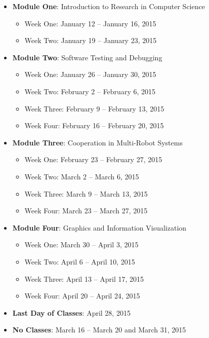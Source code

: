 \begin{itemize}

  \item {\bf Module One}: Introduction to Research in Computer Science

    \begin{itemize}
        \item Week One: January 12 -- January 16, 2015
        \item Week Two: January 19 -- January 23, 2015
    \end{itemize}

  \item {\bf Module Two}: Software Testing and Debugging 

    \begin{itemize}
        \item Week One: January 26 -- January 30, 2015
        \item Week Two: February 2 -- February 6, 2015
        \item Week Three: February 9 -- February 13, 2015
        \item Week Four: February 16 -- February 20, 2015
    \end{itemize}

  \item {\bf Module Three}: Cooperation in Multi-Robot Systems

    \begin{itemize}
        \item Week One: February 23 -- February 27, 2015
        \item Week Two: March 2 -- March 6, 2015
        \item Week Three: March 9 -- March 13, 2015
        \item Week Four: March 23 -- March 27, 2015
    \end{itemize}

  \item {\bf Module Four}: Graphics and Information Visualization

    \begin{itemize}
        \item Week One: March 30 -- April 3, 2015
        \item Week Two: April 6 -- April 10, 2015
        \item Week Three: April 13 -- April 17, 2015
        \item Week Four: April 20 -- April 24, 2015
    \end{itemize}

    \item {\bf Last Day of Classes}: April 28, 2015
    \item {\bf No Classes}: March 16 -- March 20 and March 31, 2015

\end{itemize}

